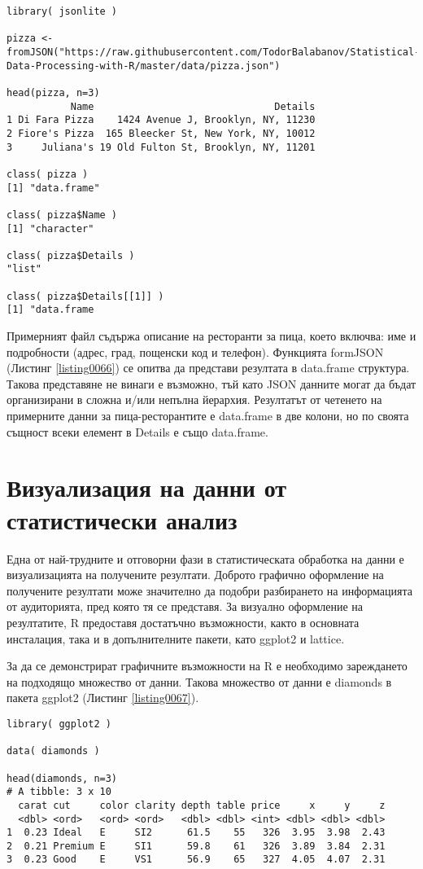 \begin{lstlisting}[caption=Четене на JSON данни, label=listing0066]
library( jsonlite )
 
pizza <- fromJSON("https://raw.githubusercontent.com/TodorBalabanov/Statistical-Data-Processing-with-R/master/data/pizza.json")

head(pizza, n=3)
           Name                               Details
1 Di Fara Pizza    1424 Avenue J, Brooklyn, NY, 11230
2 Fiore's Pizza  165 Bleecker St, New York, NY, 10012
3     Juliana's 19 Old Fulton St, Brooklyn, NY, 11201

class( pizza )
[1] "data.frame"
 
class( pizza$Name )
[1] "character"
 
class( pizza$Details )
"list"

class( pizza$Details[[1]] )
[1] "data.frame
\end{lstlisting}

Примерният файл съдържа описание на ресторанти за пица, което включва: име и подробности (адрес, град, пощенски код и телефон). Функцията formJSON (Листинг \ref{listing0066}) се опитва да представи резултата в data.frame структура. Такова представяне не винаги е възможно, тъй като JSON данните могат да бъдат организирани в сложна и/или непълна йерархия. Резултатът от четенето на примерните данни за пица-ресторантите е data.frame в две колони, но по своята същност всеки елемент в Details е също data.frame.

\section{Визуализация на данни от статистически анализ}

Една от най-трудните и отговорни фази в статистическата обработка на данни е визуализацията на получените резултати. Доброто графично оформление на получените резултати може значително да подобри разбирането на информацията от аудиторията, пред която тя се представя. За визуално оформление на резултатите, R предоставя достатъчно възможности, както в основната инсталация, така и в допълнителните пакети, като ggplot2 и lattice.

За да се демонстрират графичните възможности на R е необходимо зареждането на подходящо множество от данни. Такова множество от данни е diamonds в пакета ggplot2 (Листинг \ref{listing0067}).

\begin{lstlisting}[caption=Демонстрационно множество данни с диаманти, label=listing0067]
library( ggplot2 )

data( diamonds )
 
head(diamonds, n=3)
# A tibble: 3 x 10
  carat cut     color clarity depth table price     x     y     z
  <dbl> <ord>   <ord> <ord>   <dbl> <dbl> <int> <dbl> <dbl> <dbl>
1  0.23 Ideal   E     SI2      61.5    55   326  3.95  3.98  2.43
2  0.21 Premium E     SI1      59.8    61   326  3.89  3.84  2.31
3  0.23 Good    E     VS1      56.9    65   327  4.05  4.07  2.31
\end{lstlisting}

